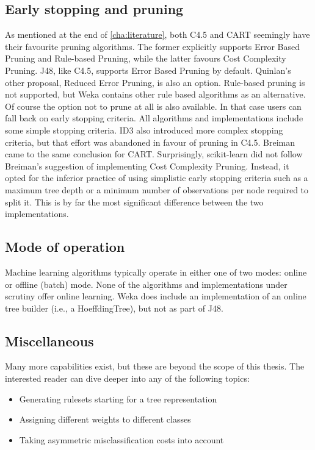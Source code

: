 \subsection{Early stopping and pruning}
As mentioned at the end of \autoref{cha:literature}, both C4.5 and CART seemingly have their favourite pruning algorithms. The former explicitly supports Error Based Pruning and Rule-based Pruning, while the latter favours Cost Complexity Pruning. J48, like C4.5, supports Error Based Pruning by default. Quinlan's other proposal, Reduced Error Pruning, is also an option. Rule-based pruning is not supported, but Weka contains other rule based algorithms as an alternative. Of course the option not to prune at all is also available. In that case users can fall back on early stopping criteria. All algorithms and implementations include some simple stopping criteria. ID3 also introduced more complex stopping criteria, but that effort was abandoned in favour of pruning in C4.5. Breiman came to the same conclusion for CART. Surprisingly, scikit-learn did not follow Breiman's suggestion of implementing Cost Complexity Pruning. Instead, it opted for the inferior practice of using simplistic early stopping criteria such as a maximum tree depth or a minimum number of observations per node required to split it. This is by far the most significant difference between the two implementations.

\subsection{Mode of operation}
Machine learning algorithms typically operate in either one of two modes: online or offline (batch) mode. None of the algorithms and implementations under scrutiny offer online learning. Weka does include an implementation of an online tree builder (i.e., a HoeffdingTree), but not as part of J48.

\subsection{Miscellaneous}
Many more capabilities exist, but these are beyond the scope of this thesis. The interested reader can dive deeper into any of the following topics:
\begin{itemize}
    \item Generating rulesets starting for a tree representation
    \item Assigning different weights to different classes
    \item Taking asymmetric misclassification costs into account
\end{itemize}

